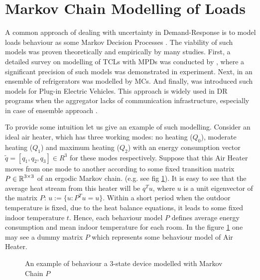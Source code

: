 \section{Markov Chain Modelling of Loads}
\label{section:markov_devices}


A common approach of dealing with uncertainty in Demand-Response is to model loads behaviour as some Markov Decision Processes . The viability of such models was proven theoretically and empirically by many studies. First, a detailed survey on modelling of TCLs with MPDs was conducted by \cite{Koch2011}, where a significant precision of such models was demonstrated in experiment. Next, in \cite{Trovato2015} an ensemble of refrigerators was modelled by MCs. And finally, \cite{Wu2016} was introduced such models for Plug-in Electric Vehicles. This approach is widely used in DR programs when the aggregator lacks of communication infrastructure, especially in case of ensemble approach \cite{Chertkov2017}. 

To provide some intuition let us give an example of such modelling. Consider an ideal air heater, which has three working modes: no heating ($Q_0$), moderate heating ($Q_1$) and maximum heating ($Q_2$) with an energy consumption vector $\widetilde{q} = [q_1, q_2, q_3] \in R^3$ for these modes respectively. Suppose that this Air Heater moves from one mode to another according to some fixed transition matrix $P \in \operatorname{\mathbb{R}}^{3 \times 3}$ of an ergodic Markov chain. (e.g. see fig \ref{fig:matrices_example}). It is easy to see that the average heat stream from this heater will be $q^Tu$, where $u$ is a unit eigenvector of the matrix $P$: $u := \{u : P^Tu = u\}$. Within a short period when the outdoor temperature is fixed, due to the heat balance equations, it leads to some fixed indoor temperature $t$. Hence, each behaviour model $P$ defines average energy consumption and mean indoor temperature for each room. In the figure \ref{fig:matrices_example} one may see a dummy matrix $P$ which represents some behaviour model of Air Heater. 

\begin{figure}[h!]
    \centering
    

    \label{fig:matrices_example}
    \caption{An example of behaviour a 3-state device modelled with Markov Chain $P$}
\end{figure} 